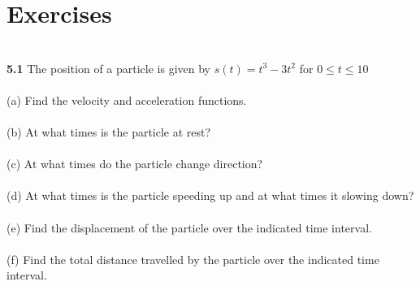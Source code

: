 \documentclass[11pt]{scrartcl}
\begin{document}
\section{Exercises} \\
\noindent 
\textbf{5.1} The position of a particle is given by $s(t)=t^3-3t^2$ for $0\leq t \leq10$\\
\\
\noindent 
(a) Find the velocity and acceleration functions. \\
\\
\noindent 
(b) At what times is the particle at rest? \\
\\
\noindent 
(c) At what times do the particle change direction? \\
\\
\noindent 
(d) At what times is the particle speeding up and at what times it slowing down? \\
\\
\noindent 
(e) Find the displacement of the particle over the indicated time interval. \\
\\
\noindent 
(f) Find the total distance travelled by the particle over the indicated time interval.
\end{document}
